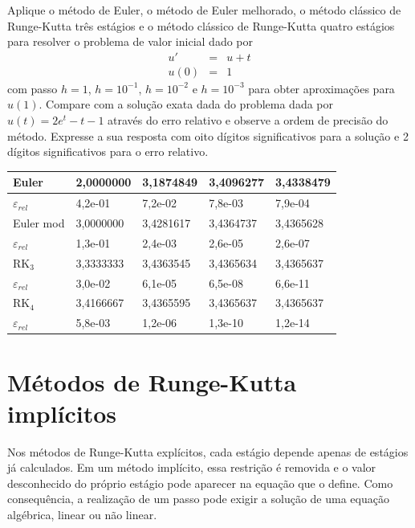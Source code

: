 \begin{exer}Aplique o método de Euler, o método de Euler melhorado, o método clássico de Runge-Kutta três estágios e o método clássico de Runge-Kutta quatro estágios para resolver o problema de valor inicial dado por
\begin{eqnarray}
u'&=& u + t\\
u(0)&=&1
\end{eqnarray}
com passo $h=1$, $h=10^{-1}$, $h=10^{-2}$ e $h=10^{-3}$  para obter aproximações para $u(1)$. Compare com a solução exata dada do problema dada por $u(t) =  2e^t-t-1$ através do erro relativo e observe a ordem de precisão do método. Expresse a sua resposta com oito dígitos significativos para a solução e 2 dígitos significativos para o erro relativo.
\end{exer}
\begin{resp}

\begin{center}
 \begin{tabular}{|l|l|l|l|l|}%
\hline
Euler & 2,0000000 & 3,1874849 & 3,4096277 & 3,4338479\\
\hline
$\varepsilon_{rel}$ & 4,2e-01 & 7,2e-02 & 7,8e-03 & 7,9e-04\\
\hline
Euler mod & 3,0000000 & 3,4281617 & 3,4364737 & 3,4365628\\
\hline
$\varepsilon_{rel}$ & 1,3e-01 & 2,4e-03 & 2,6e-05 & 2,6e-07\\
\hline
RK$_3$ & 3,3333333 & 3,4363545 & 3,4365634 & 3,4365637\\
\hline
$\varepsilon_{rel}$ & 3,0e-02 & 6,1e-05 & 6,5e-08 & 6,6e-11\\
\hline
RK$_4$ & 3,4166667 & 3,4365595 & 3,4365637 & 3,4365637\\
\hline
$\varepsilon_{rel}$ & 5,8e-03 & 1,2e-06 & 1,3e-10 & 1,2e-14\\
\hline
\end{tabular}
\end{center}
\end{resp}



\section{Métodos de Runge-Kutta implícitos}\label{sec:sec_IRK}
Nos métodos de Runge-Kutta explícitos, cada estágio depende apenas de estágios já calculados. Em um método implícito, essa restrição é removida e o valor desconhecido do próprio estágio pode aparecer na equação que o define. Como consequência, a realização de um passo pode exigir a solução de uma equação algébrica, linear ou não linear.

